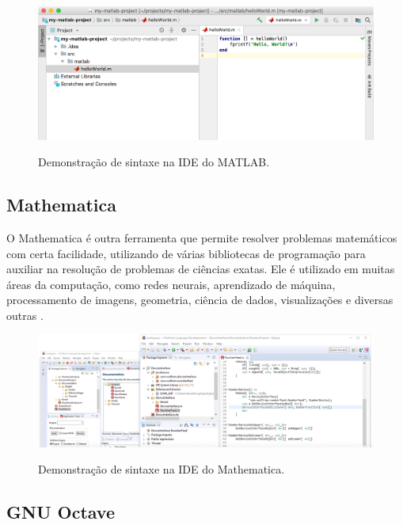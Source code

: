 \begin{figure}[H]
    \caption{\small Demonstração de sintaxe na IDE do MATLAB.}
	\centering
	\includegraphics[width=\textwidth]{figs/matlab-syntax.png}
	\label{f.matlab-syntax}
\end{figure}

\subsection{Mathematica}
\label{ss.mathematica}

O Mathematica é outra ferramenta que permite resolver problemas matemáticos com certa facilidade, utilizando de várias bibliotecas de programação para auxiliar na resolução de problemas de ciências exatas.
Ele é utilizado em muitas áreas da computação, como redes neurais, aprendizado de máquina, processamento de imagens, geometria, ciência de dados, visualizações e diversas outras \cite{mathematica}.

\begin{figure}[H]
    \caption{\small Demonstração de sintaxe na IDE do Mathematica.}
	\centering
	\includegraphics[width=\textwidth]{figs/mathematica-ide.png}
	\label{f.matlab-syntax}
\end{figure}

\subsection{GNU Octave}
\label{ss.gnu}

